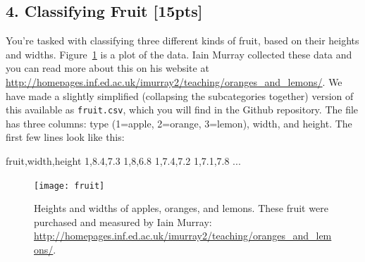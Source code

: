 \documentclass[submit]{harvardml}
\begin{document}
\subsection*{4. Classifying Fruit [15pts]}
You're tasked with  classifying three different kinds of fruit, based on their
heights and widths.  Figure~\ref{fig:fruit} is a plot of the data.  Iain Murray
collected these data and you can read more about this on his website at
\url{http://homepages.inf.ed.ac.uk/imurray2/teaching/oranges_and_lemons/}.  We
have made a slightly simplified (collapsing the subcategories together) version
of this available as \verb|fruit.csv|, which you will find in the Github repository.
The file has three columns: type (1=apple, 2=orange, 3=lemon), width,
and height.  The first few lines look like this:
\begin{csv}
fruit,width,height
1,8.4,7.3
1,8,6.8
1,7.4,7.2
1,7.1,7.8
...
\end{csv}
\begin{figure}[h]
\centering
\texttt{[image: fruit]}
\caption{Heights and widths of apples, oranges, and lemons.  These fruit were
purchased and measured by Iain Murray:
\url{http://homepages.inf.ed.ac.uk/imurray2/teaching/oranges_and_lemons/}.}
\label{fig:fruit}
\end{figure}
\end{document}
